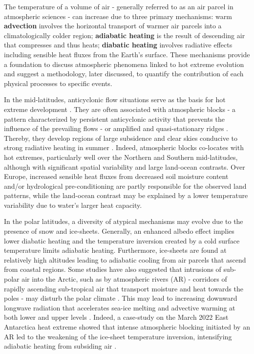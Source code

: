 \documentclass[11pt,a4paper,twoside,openright]{report}
\theoremstyle{definition}
\begin{document}
The temperature of a volume of air - generally referred to as an air parcel in atmospheric sciences - can increase due to three primary mechanisms: warm \textbf{advection} involves the horizontal transport of warmer air parcels into a climatologically colder region; \textbf{adiabatic heating} is the result of descending air that compresses and thus heats; \textbf{diabatic heating} involves radiative effects including sensible heat fluxes from the Earth's surface. These mechanisms provide a foundation to discuss atmospheric phenomena linked to hot extreme evolution and suggest a methodology, later discussed, to quantify the contribution of each physical processes to specific events.

In the mid-latitudes, anticyclonic flow situations serve as the basis for hot extreme development \citep[e.g.][]{pfahl_quantifying_2012}. They are often associated with atmospheric blocks - a pattern characterized by persistent anticyclonic activity that prevents the influence of the prevailing flows \citep{lupo_atmospheric_2021} - or amplified and quasi-stationary ridges \citep{sousa_european_2018}. Thereby, they develop regions of large subsidence and clear skies conducive to strong radiative heating in summer \citep{lupo_atmospheric_2021}. Indeed, atmospheric blocks co-locates with hot extremes, particularly well over the Northern \citep{pfahl_quantifying_2012,bieli_lagrangian_2015,brunner_dependence_2018} and Southern \citep{pezza_severe_2012} mid-latitudes, although with significant spatial variability and large land-ocean contrasts. Over Europe, increased sensible heat fluxes from decreased soil moisture content and/or hydrological pre-conditioning are partly responsible for the observed land patterns, while the land-ocean contrast may be explained by a lower temperature variability due to water's larger heat capacity.

In the polar latitudes, a diversity of atypical mechanisms may evolve due to the presence of snow and ice-sheets. Generally, an enhanced albedo effect implies lower diabatic heating and the temperature inversion created by a cold surface temperature limits adiabatic heating. Furthermore, ice-sheets are found at relatively high altitudes \citep{fretwell_bedmap2_2013} leading to adiabatic cooling from air parcels that ascend from coastal regions. Some studies have also suggested that intrusions of sub-polar air into the Arctic, such as by atmospheric rivers (AR) - corridors of rapidly ascending sub-tropical air that transport moisture and heat towards the poles - may disturb the polar climate \citep{ma_wintertime_2024, papritz_role_2023}. This may lead to increasing downward longwave radiation that accelerates sea-ice melting \citep{kapsch_springtime_2013, mortin_melt_2016} and advective warming at both lower and upper levels \citep{papritz_role_2023}. Indeed, a case-study on the March 2022 East Antarctica heat extreme showed that intense atmospheric blocking initiated by an AR led to the weakening of the ice-sheet temperature inversion, intensifying adiabatic heating from subsiding air \citep{wille_extraordinary_2024}.
\end{document}
